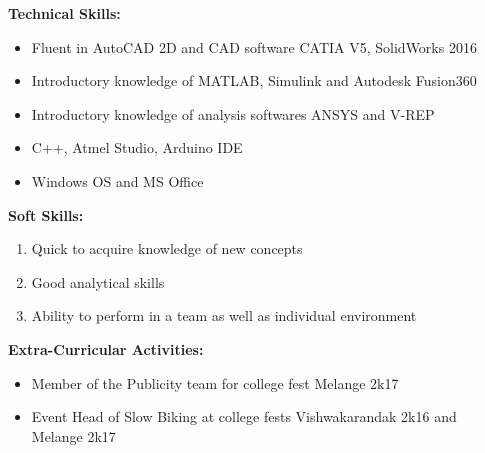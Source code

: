 \documentclass{article}
\begin{document}
\begin{flushleft}
		\medskip
		\textbf{Technical Skills:} 
		\begin{itemize}
			\item Fluent in AutoCAD 2D and CAD software CATIA V5, SolidWorks 2016
			\item Introductory knowledge of MATLAB, Simulink and Autodesk Fusion360
			\item Introductory knowledge of analysis softwares ANSYS and V-REP
			\item C++, Atmel Studio, Arduino IDE
			\item Windows OS and MS Office
		\end{itemize}
		
		\medskip
		\textbf{Soft Skills:} 
		\begin{enumerate}
			\item Quick to acquire knowledge of new concepts
			\item Good analytical skills
			\item Ability to perform in a team as well as individual environment
		\end{enumerate}
	
		\medskip
		\textbf{Extra-Curricular Activities:} 
		\begin{itemize}
			\item Member of the Publicity team for college fest Melange 2k17
			\item Event Head of Slow Biking at college fests Vishwakarandak 2k16 and Melange 2k17
		\end{itemize}
		
	\end{flushleft}
\end{document}
